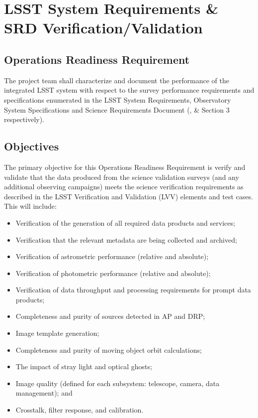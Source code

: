 \section{LSST System Requirements \& SRD Verification/Validation}  \label{sec:srd}

\subsection{Operations Readiness Requirement}
The project team shall characterize and document the performance of the integrated LSST system with respect to the survey performance requirements and specifications enumerated in the LSST System Requirements, Observatory System Specifications and Science Requirements Document (,  \&  Section 3 respectively).

\subsection{Objectives}

The primary objective for this Operations Readiness Requirement is verify and validate that the data produced from the science validation surveys (and any additional observing campaigns) meets the science verification requirements as described in the LSST Verification and Validation (LVV) elements and test cases. This will include:

\begin{itemize}
	\item Verification of the generation of all required data products and services;
 	\item Verification that the relevant metadata are being collected and archived;
	\item Verification of astrometric performance (relative and absolute);
	\item Verification of photometric performance (relative and absolute);
	\item Verification of data throughput and processing requirements for prompt data products;  
	\item Completeness and purity of sources detected in AP and DRP;
	\item Image template generation;
	\item Completeness and purity of moving object orbit calculations;
	\item The impact of stray light and optical ghosts;
	\item Image quality (defined for each subsystem: telescope, camera, data management); and
	\item Crosstalk, filter response, and calibration.	
\end{itemize}

